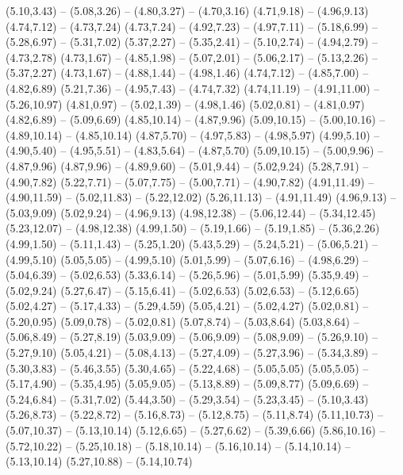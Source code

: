 {  (5.10,3.43) -- (5.08,3.26) -- (4.80,3.27) -- (4.70,3.16)
  (4.71,9.18) -- (4.96,9.13)
  (4.74,7.12) -- (4.73,7.24)
  (4.73,7.24) -- (4.92,7.23) -- (4.97,7.11) -- (5.18,6.99) -- (5.28,6.97) -- (5.31,7.02)
  (5.37,2.27) -- (5.35,2.41) -- (5.10,2.74) -- (4.94,2.79) -- (4.73,2.78)
  (4.73,1.67) -- (4.85,1.98) -- (5.07,2.01) -- (5.06,2.17) -- (5.13,2.26) -- (5.37,2.27)
  (4.73,1.67) -- (4.88,1.44) -- (4.98,1.46)
  (4.74,7.12) -- (4.85,7.00) -- (4.82,6.89)
  (5.21,7.36) -- (4.95,7.43) -- (4.74,7.32)
  (4.74,11.19) -- (4.91,11.00) -- (5.26,10.97)
  (4.81,0.97) -- (5.02,1.39) -- (4.98,1.46)
  (5.02,0.81) -- (4.81,0.97)
  (4.82,6.89) -- (5.09,6.69)
  (4.85,10.14) -- (4.87,9.96)
  (5.09,10.15) -- (5.00,10.16) -- (4.89,10.14) -- (4.85,10.14)
  (4.87,5.70) -- (4.97,5.83) -- (4.98,5.97)
  (4.99,5.10) -- (4.90,5.40) -- (4.95,5.51) -- (4.83,5.64) -- (4.87,5.70)
  (5.09,10.15) -- (5.00,9.96) -- (4.87,9.96)
  (4.87,9.96) -- (4.89,9.60) -- (5.01,9.44) -- (5.02,9.24)
  (5.28,7.91) -- (4.90,7.82)
  (5.22,7.71) -- (5.07,7.75) -- (5.00,7.71) -- (4.90,7.82)
  (4.91,11.49) -- (4.90,11.59) -- (5.02,11.83) -- (5.22,12.02)
  (5.26,11.13) -- (4.91,11.49)
  (4.96,9.13) -- (5.03,9.09)
  (5.02,9.24) -- (4.96,9.13)
  (4.98,12.38) -- (5.06,12.44) -- (5.34,12.45)
  (5.23,12.07) -- (4.98,12.38)
  (4.99,1.50) -- (5.19,1.66) -- (5.19,1.85) -- (5.36,2.26)
  (4.99,1.50) -- (5.11,1.43) -- (5.25,1.20)
  (5.43,5.29) -- (5.24,5.21) -- (5.06,5.21) -- (4.99,5.10)
  (5.05,5.05) -- (4.99,5.10)
  (5.01,5.99) -- (5.07,6.16) -- (4.98,6.29) -- (5.04,6.39) -- (5.02,6.53)
  (5.33,6.14) -- (5.26,5.96) -- (5.01,5.99)
  (5.35,9.49) -- (5.02,9.24)
  (5.27,6.47) -- (5.15,6.41) -- (5.02,6.53)
  (5.02,6.53) -- (5.12,6.65)
  (5.02,4.27) -- (5.17,4.33) -- (5.29,4.59)
  (5.05,4.21) -- (5.02,4.27)
  (5.02,0.81) -- (5.20,0.95)
  (5.09,0.78) -- (5.02,0.81)
  (5.07,8.74) -- (5.03,8.64)
  (5.03,8.64) -- (5.06,8.49) -- (5.27,8.19)
  (5.03,9.09) -- (5.06,9.09) -- (5.08,9.09) -- (5.26,9.10) -- (5.27,9.10)
  (5.05,4.21) -- (5.08,4.13) -- (5.27,4.09) -- (5.27,3.96) -- (5.34,3.89) -- (5.30,3.83) -- (5.46,3.55)
  (5.30,4.65) -- (5.22,4.68) -- (5.05,5.05)
  (5.05,5.05) -- (5.17,4.90) -- (5.35,4.95)
  (5.05,9.05) -- (5.13,8.89) -- (5.09,8.77)
  (5.09,6.69) -- (5.24,6.84) -- (5.31,7.02)
  (5.44,3.50) -- (5.29,3.54) -- (5.23,3.45) -- (5.10,3.43)
  (5.26,8.73) -- (5.22,8.72) -- (5.16,8.73) -- (5.12,8.75) -- (5.11,8.74)
  (5.11,10.73) -- (5.07,10.37) -- (5.13,10.14)
  (5.12,6.65) -- (5.27,6.62) -- (5.39,6.66)
  (5.86,10.16) -- (5.72,10.22) -- (5.25,10.18) -- (5.18,10.14) -- (5.16,10.14) -- (5.14,10.14) -- (5.13,10.14)
  (5.27,10.88) -- (5.14,10.74)
}
